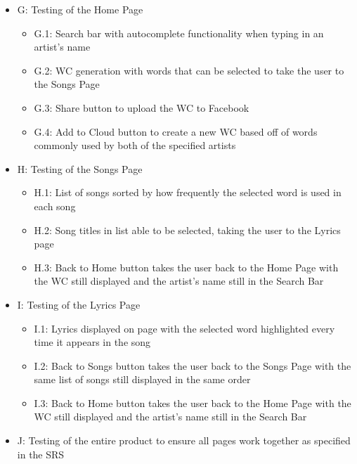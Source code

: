 \documentclass[]{article}
\begin{document}
\begin{itemize}
  \begin{itemize}
  \itemsep1pt\parskip0pt
  \item
    G: Testing of the Home Page

    \begin{itemize}
    \itemsep1pt\parskip0pt
    \item
      G.1: Search bar with autocomplete functionality when typing in an
      artist's name
    \item
      G.2: WC generation with words that can be selected to take the
      user to the Songs Page
    \item
      G.3: Share button to upload the WC to Facebook
    \item
      G.4: Add to Cloud button to create a new WC based off of words
      commonly used by both of the specified artists
    \end{itemize}
  \item
    H: Testing of the Songs Page

    \begin{itemize}
    \itemsep1pt\parskip0pt
    \item
      H.1: List of songs sorted by how frequently the selected word is
      used in each song
    \item
      H.2: Song titles in list able to be selected, taking the user to
      the Lyrics page
    \item
      H.3: Back to Home button takes the user back to the Home Page with
      the WC still displayed and the artist's name still in the Search
      Bar
    \end{itemize}
  \item
    I: Testing of the Lyrics Page

    \begin{itemize}
    \itemsep1pt\parskip0pt
    \item
      I.1: Lyrics displayed on page with the selected word highlighted
      every time it appears in the song
    \item
      I.2: Back to Songs button takes the user back to the Songs Page
      with the same list of songs still displayed in the same order
    \item
      I.3: Back to Home button takes the user back to the Home Page with
      the WC still displayed and the artist's name still in the Search
      Bar
    \end{itemize}
  \item
    J: Testing of the entire product to ensure all pages work together
    as specified in the SRS
  \end{itemize}
\end{itemize}
\end{document}
